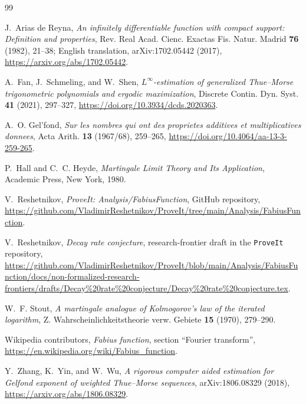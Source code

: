 \documentclass[11pt,oneside]{article}
\theoremstyle{definition}
\theoremstyle{remark}
\begin{document}
\begin{thebibliography}{99}

J.~Arias de Reyna,
\newblock \emph{An infinitely differentiable function with compact support:
Definition and properties},
\newblock Rev. Real Acad. Cienc. Exactas Fis. Natur. Madrid \textbf{76} (1982),
21--38; English translation, arXiv:1702.05442 (2017),
\newblock \url{https://arxiv.org/abs/1702.05442}.

A.~Fan, J.~Schmeling, and W.~Shen,
\newblock \emph{$L^\infty$-estimation of generalized Thue--Morse
trigonometric polynomials and ergodic maximization},
\newblock Discrete Contin. Dyn. Syst. \textbf{41} (2021), 297--327,
\newblock \url{https://doi.org/10.3934/dcds.2020363}.

A.~O. Gel'fond,
\newblock \emph{Sur les nombres qui ont des proprietes additives et
multiplicatives donnees},
\newblock Acta Arith. \textbf{13} (1967/68), 259--265,
\newblock \url{https://doi.org/10.4064/aa-13-3-259-265}.

P.~Hall and C.~C. Heyde,
\newblock \emph{Martingale Limit Theory and Its Application},
\newblock Academic Press, New York, 1980.

V.~Reshetnikov,
\newblock \emph{ProveIt: Analysis/FabiusFunction}, GitHub repository,
\newblock \url{https://github.com/VladimirReshetnikov/ProveIt/tree/main/Analysis/FabiusFunction}.

V.~Reshetnikov,
\newblock \emph{Decay rate conjecture}, research-frontier draft in the
\texttt{ProveIt} repository,
\newblock \url{https://github.com/VladimirReshetnikov/ProveIt/blob/main/Analysis/FabiusFunction/docs/non-formalized-research-frontiers/drafts/Decay%20rate%20conjecture/Decay%20rate%20conjecture.tex}.

W.~F. Stout,
\newblock \emph{A martingale analogue of Kolmogorov's law of the iterated
logarithm},
\newblock Z. Wahrscheinlichkeitstheorie verw. Gebiete \textbf{15} (1970),
279--290.

Wikipedia contributors,
\newblock \emph{Fabius function}, section ``Fourier transform'',
\newblock \url{https://en.wikipedia.org/wiki/Fabius_function}.

Y.~Zhang, K.~Yin, and W.~Wu,
\newblock \emph{A rigorous computer aided estimation for Gelfond exponent of
weighted Thue--Morse sequences},
\newblock arXiv:1806.08329 (2018),
\newblock \url{https://arxiv.org/abs/1806.08329}.

\end{thebibliography}
\end{document}
